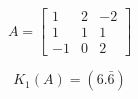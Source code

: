 \[
A=\left[
\begin{array}{ccc}
1 & 2 & -2 \\
1 & 1 & 1\\
-1 & 0 & 2
\end{array}\right]
\]
\bigskip

\[
  K_1(A)= \left( 6.{\bar{6}}
  \right)
\]
